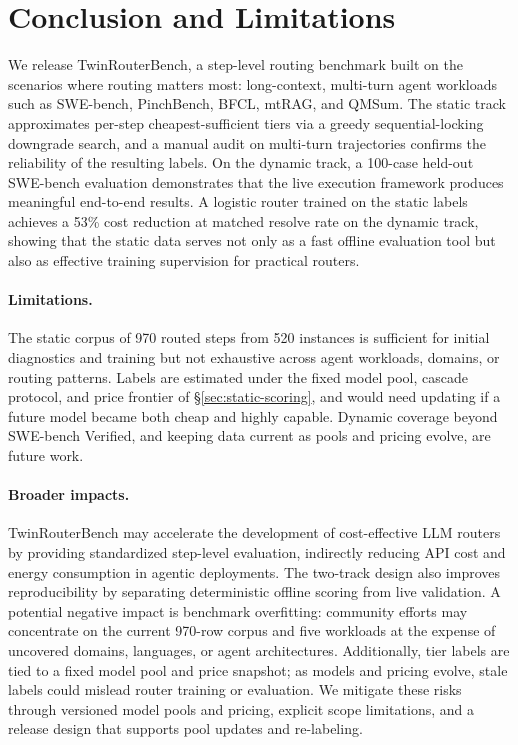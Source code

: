 \section{Conclusion and Limitations}
\label{sec:conclusion}

We release TwinRouterBench, a step-level routing benchmark built on the
scenarios where routing matters most: long-context, multi-turn agent
workloads such as SWE-bench, PinchBench, BFCL, mtRAG, and QMSum. The
static track approximates per-step cheapest-sufficient tiers via a greedy
sequential-locking downgrade search, and a manual audit on multi-turn
trajectories confirms the reliability of the resulting labels. On the
dynamic track, a 100-case held-out SWE-bench evaluation demonstrates that
the live execution framework produces meaningful end-to-end results. A
logistic router trained on the static labels achieves a 53\% cost reduction
at matched resolve rate on the dynamic track, showing that the static data
serves not only as a fast offline evaluation tool but also as effective
training supervision for practical routers.

\paragraph{Limitations.}\label{sec:limitations}
The static corpus of 970 routed steps from 520 instances is sufficient for
initial diagnostics and training but not exhaustive across agent workloads,
domains, or routing patterns. Labels are estimated under the fixed model pool,
cascade protocol, and price frontier of \S\ref{sec:static-scoring}, and
would need updating if a future model became both cheap and highly capable.
Dynamic coverage beyond SWE-bench Verified, and keeping data current as
pools and pricing evolve, are future work.

\paragraph{Broader impacts.}
TwinRouterBench may accelerate the development of cost-effective LLM
routers by providing standardized step-level evaluation, indirectly
reducing API cost and energy consumption in agentic deployments. The
two-track design also improves reproducibility by separating
deterministic offline scoring from live validation. A potential negative
impact is benchmark overfitting: community efforts may concentrate on
the current 970-row corpus and five workloads at the expense of
uncovered domains, languages, or agent architectures. Additionally,
tier labels are tied to a fixed model pool and price snapshot; as
models and pricing evolve, stale labels could mislead router training
or evaluation. We mitigate these risks through versioned model pools
and pricing, explicit scope limitations, and a release design that
supports pool updates and re-labeling.
